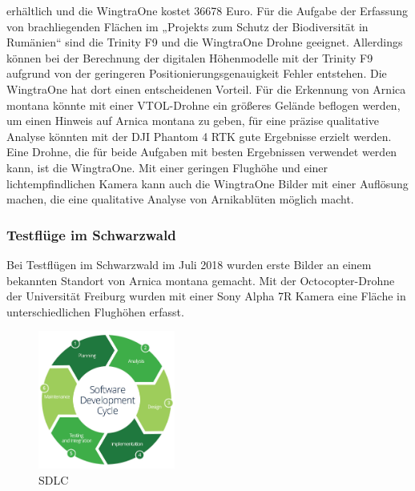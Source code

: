 erhältlich und die WingtraOne kostet 36678 Euro. %
Für die Aufgabe der Erfassung von brachliegenden Flächen im „Projekts zum Schutz der Biodiversität in Rumänien“ sind die Trinity F9 und die WingtraOne Drohne geeignet. Allerdings können bei der Berechnung der digitalen Höhenmodelle mit der Trinity F9 aufgrund von der geringeren Positionierungsgenauigkeit Fehler entstehen. Die WingtraOne hat dort einen entscheidenen Vorteil. Für die Erkennung von Arnica montana könnte mit einer VTOL-Drohne ein größeres Gelände beflogen werden, um einen Hinweis auf Arnica montana zu geben, für eine präzise qualitative Analyse könnten mit der DJI Phantom 4 RTK gute Ergebnisse erzielt werden. Eine Drohne, die für beide Aufgaben mit besten Ergebnissen verwendet werden kann, ist die WingtraOne. Mit einer geringen Flughöhe und einer lichtempfindlichen Kamera kann auch die WingtraOne Bilder mit einer Auflösung machen, die eine qualitative Analyse von Arnikablüten möglich macht. 

\subsubsection{Testflüge im Schwarzwald}

Bei Testflügen im Schwarzwald im Juli 2018 wurden erste Bilder an einem bekannten Standort von Arnica montana gemacht. Mit der Octocopter-Drohne der Universität Freiburg wurden mit einer Sony Alpha 7R Kamera eine Fläche in unterschiedlichen Flughöhen erfasst. 
\begin{figure}
  \vspace{-30pt}
  \begin{center}
    \includegraphics[width=0.4\textwidth]{abb/SDLC}
  \end{center}
  \vspace{-20pt}
  \caption[System Developement Life Circle \citep{Smartsheet2019}]{\footnotesize SDLC \citep{Smartsheet2019}}
  \label{fig:sdlc}
  \vspace{-20pt}
\end{figure}

